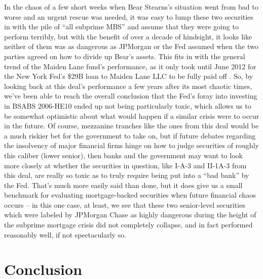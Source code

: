 \documentclass[12pt]{article}
\begin{document}
In the chaos of a few short weeks when Bear Stearns’s situation went from bad to worse and an urgent rescue was needed, it was easy to lump these two securities in with the pile of “all subprime MBS” and assume that they were going to perform terribly, but with the benefit of over a decade of hindsight, it looks like neither of them was as dangerous as JPMorgan or the Fed assumed when the two parties agreed on how to divide up Bear’s assets. This fits in with the general trend of the Maiden Lane fund’s performance, as it only took until June 2012 for the New York Fed’s \$29B loan to Maiden Lane LLC to be fully paid off \parencite{schaefer12}. So, by looking back at this deal’s performance a few years after its most chaotic times, we’ve been able to reach the overall conclusion that the Fed’s foray into investing in BSABS 2006-HE10 ended up not being particularly toxic, which allows us to be somewhat optimistic about what would happen if a similar crisis were to occur in the future. Of course, mezzanine tranches like the ones from this deal would be a much riskier bet for the government to take on, but if future debates regarding the insolvency of major financial firms hinge on how to judge securities of roughly this caliber (lower senior), then banks and the government may want to look more closely at whether the securities in question, like I-A-3 and II-1A-3 from this deal, are really so toxic as to truly require being put into a “bad bank” by the Fed. That’s much more easily said than done, but it does give us a small benchmark for evaluating mortgage-backed securities when future financial chaos occurs – in this one case, at least, we see that these two senior-level securities which were labeled by JPMorgan Chase as highly dangerous during the height of the subprime mortgage crisis did not completely collapse, and in fact performed reasonably well, if not spectacularly so.


\section*{Conclusion}
\end{document}
